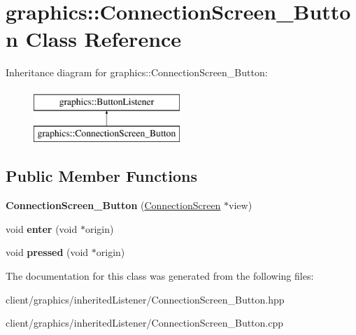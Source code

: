 \hypertarget{classgraphics_1_1_connection_screen___button}{\section{graphics\-:\-:Connection\-Screen\-\_\-\-Button Class Reference}
\label{classgraphics_1_1_connection_screen___button}
}
Inheritance diagram for graphics\-:\-:Connection\-Screen\-\_\-\-Button\-:\begin{figure}[H]
\begin{center}
\leavevmode
\includegraphics[height=2.000000cm]{classgraphics_1_1_connection_screen___button}
\end{center}
\end{figure}
\subsection*{Public Member Functions}
\begin{DoxyCompactItemize}
\item 
\hypertarget{classgraphics_1_1_connection_screen___button_afd9bd69ea06341d3a1e4a8fd7c4796d9}{{\bfseries Connection\-Screen\-\_\-\-Button} (\hyperlink{classgraphics_1_1_connection_screen}{Connection\-Screen} $\ast$view)}\label{classgraphics_1_1_connection_screen___button_afd9bd69ea06341d3a1e4a8fd7c4796d9}

\item 
\hypertarget{classgraphics_1_1_connection_screen___button_a974ada5edc17ad655be05da80adbfdf7}{void {\bfseries enter} (void $\ast$origin)}\label{classgraphics_1_1_connection_screen___button_a974ada5edc17ad655be05da80adbfdf7}

\item 
\hypertarget{classgraphics_1_1_connection_screen___button_a3b88cdd5f18f5b6aca584361600de89b}{void {\bfseries pressed} (void $\ast$origin)}\label{classgraphics_1_1_connection_screen___button_a3b88cdd5f18f5b6aca584361600de89b}

\end{DoxyCompactItemize}


The documentation for this class was generated from the following files\-:\begin{DoxyCompactItemize}
\item 
client/graphics/inherited\-Listener/Connection\-Screen\-\_\-\-Button.\-hpp\item 
client/graphics/inherited\-Listener/Connection\-Screen\-\_\-\-Button.\-cpp\end{DoxyCompactItemize}
